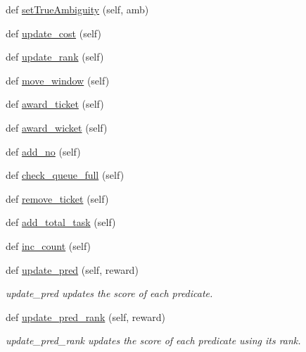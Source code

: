 \begin{DoxyCompactItemize}
def \mbox{\hyperlink{classdynamicfilterapp_1_1models_1_1_predicate_aec5ecc4928cd887effbee7c856705901}{set\+True\+Ambiguity}} (self, amb)
\item 
def \mbox{\hyperlink{classdynamicfilterapp_1_1models_1_1_predicate_a848ee4c7a2121d6e272137b6d3c8b843}{update\+\_\+cost}} (self)
\item 
def \mbox{\hyperlink{classdynamicfilterapp_1_1models_1_1_predicate_ab9e5706b198fa9e44ba1560ac6ed6687}{update\+\_\+rank}} (self)
\item 
def \mbox{\hyperlink{classdynamicfilterapp_1_1models_1_1_predicate_a8a786176b300908a48478d640cd17e87}{move\+\_\+window}} (self)
\item 
def \mbox{\hyperlink{classdynamicfilterapp_1_1models_1_1_predicate_a532e4b5776e0364bd6c0b79bc06dce03}{award\+\_\+ticket}} (self)
\item 
def \mbox{\hyperlink{classdynamicfilterapp_1_1models_1_1_predicate_aae60ca5acfd2133e3c3938aa8013bbb8}{award\+\_\+wicket}} (self)
\item 
def \mbox{\hyperlink{classdynamicfilterapp_1_1models_1_1_predicate_adae340e94226ce820610efca7daf16e3}{add\+\_\+no}} (self)
\item 
def \mbox{\hyperlink{classdynamicfilterapp_1_1models_1_1_predicate_a5e4bd5c707fd3d9a4b5a729afea6ab95}{check\+\_\+queue\+\_\+full}} (self)
\item 
def \mbox{\hyperlink{classdynamicfilterapp_1_1models_1_1_predicate_aa50b82ab39c996d4b89694655057ab8e}{remove\+\_\+ticket}} (self)
\item 
def \mbox{\hyperlink{classdynamicfilterapp_1_1models_1_1_predicate_abc989a62ab5e42f27e19abb3f0744d0d}{add\+\_\+total\+\_\+task}} (self)
\item 
def \mbox{\hyperlink{classdynamicfilterapp_1_1models_1_1_predicate_abe39cd365c5c5fe81f91f66e1a331599}{inc\+\_\+count}} (self)
\item 
def \mbox{\hyperlink{classdynamicfilterapp_1_1models_1_1_predicate_a10d89924e071640aee4eedd86662e505}{update\+\_\+pred}} (self, reward)
\begin{DoxyCompactList}\small\item\em update\+\_\+pred updates the score of each predicate. \end{DoxyCompactList}\item 
def \mbox{\hyperlink{classdynamicfilterapp_1_1models_1_1_predicate_a8945ec4943839cc7dc37954ae33e2397}{update\+\_\+pred\+\_\+rank}} (self, reward)
\begin{DoxyCompactList}\small\item\em update\+\_\+pred\+\_\+rank updates the score of each predicate using its rank. \end{DoxyCompactList}\item 

\end{DoxyCompactItemize}
